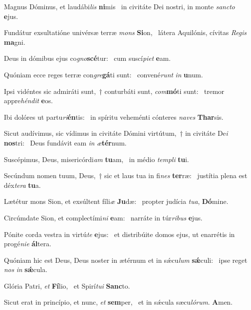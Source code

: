 \item Magnus Dóminus, et laudábi\textit{lis} \textbf{ni}mis~\psstar{} in civitáte Dei nostri, in monte \textit{sancto} \textbf{e}jus.
\item Fundátur exsultatióne univérsæ terræ \textit{mons} \textbf{Si}on,~\psstar{} látera Aquilónis, cívitas \textit{Regis} \textbf{ma}gni.
\item Deus in dómibus ejus co\textit{gno}\textbf{scé}tur:~\psstar{} cum suscí\textit{piet} \textbf{e}am.
\item Quóniam ecce reges terræ con\textit{gre}\textbf{gá}ti sunt:~\psstar{} convené\textit{runt} \textit{in} \textbf{u}num.
\item Ipsi vidéntes sic admiráti sunt,~† conturbáti sunt, \textit{com}\textbf{mó}ti sunt:~\psstar{} tremor appre\textit{héndit} \textbf{e}os.
\item Ibi dolóres ut partu\textit{ri}\textbf{én}tis:~\psstar{} in spíritu veheménti cónteres \textit{naves} \textbf{Thar}sis.
\item Sicut audívimus, sic vídimus in civitáte Dómini virtútum,~† in civitáte De\textit{i} \textbf{nos}tri:~\psstar{} Deus fundávit eam \textit{in} \textit{æ}\textbf{tér}num.
\item Suscépimus, Deus, misericórdi\textit{am} \textbf{tu}am,~\psstar{} in médio \textit{templi} \textbf{tu}i.
\item Secúndum nomen tuum, Deus,~† sic et laus tua in fi\textit{nes} \textbf{ter}ræ:~\psstar{} justítia plena est déx\textit{tera} \textbf{tu}a.
\item Lætétur mons Sion, et exsúltent fíli\textit{æ} \textbf{Ju}dæ:~\psstar{} propter judícia \textit{tua}, \textbf{Dó}mine.
\item Circúmdate Sion, et complectími\textit{ni} \textbf{e}am:~\psstar{} narráte in túr\textit{ribus} \textbf{e}jus.
\item Pónite corda vestra in virtú\textit{te} \textbf{e}jus:~\psstar{} et distribúite domos ejus, ut enarrétis in progé\textit{nie} \textbf{ál}tera.
\item Quóniam hic est Deus, Deus noster in ætérnum et in sǽcu\textit{lum} \textbf{sǽ}culi:~\psstar{} ipse reget \textit{nos} \textit{in} \textbf{sǽ}cula.
\item Glória Patri, \textit{et} \textbf{Fí}lio,~\psstar{} et Spirí\textit{tui} \textbf{Sanc}to.
\item Sicut erat in princípio, et nunc, \textit{et} \textbf{sem}per,~\psstar{} et in sǽcula sæcu\textit{lórum}. \textbf{A}men.